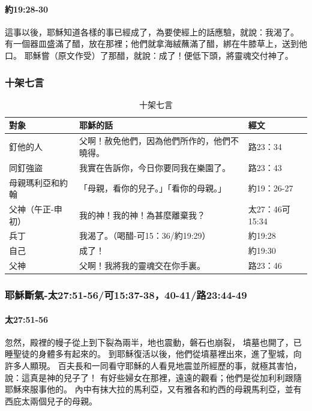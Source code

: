 \paragraph{約19:28-30}
這事以後，耶穌知道各樣的事已經成了，為要使經上的話應驗，就說：我渴了。
有一個器皿盛滿了醋，放在那裡；他們就拿海絨蘸滿了醋，綁在牛膝草上，送到他口。
耶穌嘗（原文作受）了那醋，就說：成了！便低下頭，將靈魂交付神了。

\subsubsection{十架七言}
\begin{table}[htbp]
  \centering
    \begin{tabular}{|p{8.07em}|p{20.645em}|p{7.85em}|}
    \toprule
    對象    & 耶穌的話  & 經文 \\
    \midrule
    釘他的人  & 父啊！赦免他們，因為他們所作的，他們不曉得。 & 路23：34 \\
    \midrule
    同釘強盜  & 我實在告訴你，今日你要同我在樂園了。 & 路23：43 \\
    \midrule
    母親瑪利亞和約翰 & 「母親，看你的兒子。」「看你的母親。」 & 約19：26-27 \\
    \midrule
    \multirow{1}{*}{父神（午正-申初）} & 我的神！我的神！為甚麼離棄我？ & \multirow{1}{*}{太27：46可15:34} \\   
    \midrule
    兵丁    & 我渴了。（喝醋-可15：36/約19:29） & 約19:28 \\
    \midrule
    自己    & 成了！   & 約19:30 \\
    \midrule
    父神    & 父啊！我將我的靈魂交在你手裏。 & 路23：46 \\
    \bottomrule
    \end{tabular}%
   \caption{十架七言}  
  \label{tab:addlabel}%
\end{table}


\subsubsection{耶穌斷氣-太27:51-56/可15:37-38，40-41/路23:44-49}


\paragraph{太27:51-56}忽然，殿裡的幔子從上到下裂為兩半，地也震動，磐石也崩裂，
墳墓也開了，已睡聖徒的身體多有起來的。
到耶穌復活以後，他們從墳墓裡出來，進了聖城，向許多人顯現。
百夫長和一同看守耶穌的人看見地震並所經歷的事，就極其害怕，說：這真是神的兒子了！
有好些婦女在那裡，遠遠的觀看；他們是從加利利跟隨耶穌來服事他的。
內中有抹大拉的馬利亞，又有雅各和約西的母親馬利亞，並有西庇太兩個兒子的母親。
